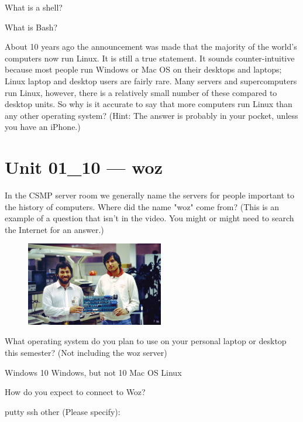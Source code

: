 \documentclass[letterpaper,12pt]{exam}
\begin{document}
\begin{questions}
\question What is a shell?
\vspace{1.5cm}

\question What is Bash? 
\vspace{1.5cm}


\question About 10 years ago the announcement was made that the majority of the world's computers now run Linux.  It is still a true statement.  It sounds counter-intuitive because most people run Windows or Mac OS on their desktops and laptops; Linux laptop and desktop users are fairly rare.  Many servers and supercomputers run Linux, however, there is a relatively small number of these compared to desktop units.  So why is it accurate to say that more computers run Linux than any other operating system? (Hint: The answer is probably in your pocket, unless you have an iPhone.) 
\vspace{1.5cm}
\section*{Unit 01\_10 --- woz}

\question In the CSMP server room we generally name the servers for people important to the history of computers.  Where did the name "woz" come from?  (This is an example of a question that isn't in the video.  You might or might need to search the Internet for an answer.)
\begin{figure}[h]
	\includegraphics[width=6cm,right]{s_and_w}
\end{figure}

\question What operating system do you plan to use on your personal laptop or desktop this semester? (Not including the woz server)
\begin{checkboxes}
\choice Windows 10
\choice Windows, but not 10
\choice Mac OS
\choice Linux
\end{checkboxes}

\begin{samepage}
\question How do you expect to connect to Woz? 
\begin{checkboxes}
\choice putty
\choice ssh
\choice other (Please specify):
\end{checkboxes}
\end{samepage}


\end{questions}
\end{document}

